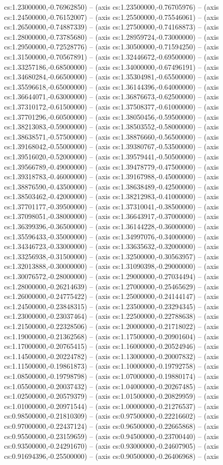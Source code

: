 cs:1.23000000,-0.76962850) -- (axis cs:1.23500000,-0.76705976) -- (axis cs:1.24500000,-0.76152007) -- (axis cs:1.25500000,-0.75546061) -- (axis cs:1.26500000,-0.74887339) -- (axis cs:1.27500000,-0.74168873) -- (axis cs:1.28000000,-0.73785680) -- (axis cs:1.28959724,-0.73000000) -- (axis cs:1.29500000,-0.72528776) -- (axis cs:1.30500000,-0.71594250) -- (axis cs:1.31500000,-0.70567891) -- (axis cs:1.32446672,-0.69500000) -- (axis cs:1.33257186,-0.68500000) -- (axis cs:1.34000000,-0.67496191) -- (axis cs:1.34680284,-0.66500000) -- (axis cs:1.35304981,-0.65500000) -- (axis cs:1.35596618,-0.65000000) -- (axis cs:1.36144396,-0.64000000) -- (axis cs:1.36644071,-0.63000000) -- (axis cs:1.36876673,-0.62500000) -- (axis cs:1.37310172,-0.61500000) -- (axis cs:1.37508377,-0.61000000) -- (axis cs:1.37701296,-0.60500000) -- (axis cs:1.38050456,-0.59500000) -- (axis cs:1.38213083,-0.59000000) -- (axis cs:1.38503552,-0.58000000) -- (axis cs:1.38638571,-0.57500000) -- (axis cs:1.38876660,-0.56500000) -- (axis cs:1.39168042,-0.55000000) -- (axis cs:1.39380767,-0.53500000) -- (axis cs:1.39516020,-0.52000000) -- (axis cs:1.39579441,-0.50500000) -- (axis cs:1.39566789,-0.49000000) -- (axis cs:1.39478779,-0.47500000) -- (axis cs:1.39318783,-0.46000000) -- (axis cs:1.39167988,-0.45000000) -- (axis cs:1.38876590,-0.43500000) -- (axis cs:1.38638489,-0.42500000) -- (axis cs:1.38503462,-0.42000000) -- (axis cs:1.38212983,-0.41000000) -- (axis cs:1.37701177,-0.39500000) -- (axis cs:1.37310041,-0.38500000) -- (axis cs:1.37098051,-0.38000000) -- (axis cs:1.36643917,-0.37000000) -- (axis cs:1.36399396,-0.36500000) -- (axis cs:1.36144228,-0.36000000) -- (axis cs:1.35596433,-0.35000000) -- (axis cs:1.34997076,-0.34000000) -- (axis cs:1.34346723,-0.33000000) -- (axis cs:1.33635632,-0.32000000) -- (axis cs:1.33256938,-0.31500000) -- (axis cs:1.32500000,-0.30563957) -- (axis cs:1.32013888,-0.30000000) -- (axis cs:1.31090398,-0.29000000) -- (axis cs:1.30076572,-0.28000000) -- (axis cs:1.29000000,-0.27034494) -- (axis cs:1.28000000,-0.26214639) -- (axis cs:1.27000000,-0.25465629) -- (axis cs:1.26000000,-0.24775422) -- (axis cs:1.25000000,-0.24144147) -- (axis cs:1.24500000,-0.23848315) -- (axis cs:1.23500000,-0.23294345) -- (axis cs:1.23000000,-0.23037464) -- (axis cs:1.22500000,-0.22788638) -- (axis cs:1.21500000,-0.22328506) -- (axis cs:1.20000000,-0.21718022) -- (axis cs:1.19000000,-0.21362568) -- (axis cs:1.17500000,-0.20901604) -- (axis cs:1.17000000,-0.20765415) -- (axis cs:1.16000000,-0.20524946) -- (axis cs:1.14500000,-0.20224782) -- (axis cs:1.13000000,-0.20007832) -- (axis cs:1.11500000,-0.19861873) -- (axis cs:1.10000000,-0.19792758) -- (axis cs:1.08500000,-0.19798798) -- (axis cs:1.07000000,-0.19880174) -- (axis cs:1.05500000,-0.20037432) -- (axis cs:1.04000000,-0.20267485) -- (axis cs:1.02500000,-0.20579379) -- (axis cs:1.01500000,-0.20829959) -- (axis cs:1.01000000,-0.20971544) -- (axis cs:1.00000000,-0.21276537) -- (axis cs:0.98500000,-0.21810309) -- (axis cs:0.97500000,-0.22216602) -- (axis cs:0.97000000,-0.22437124) -- (axis cs:0.96500000,-0.22665868) -- (axis cs:0.95500000,-0.23159659) -- (axis cs:0.94500000,-0.23700440) -- (axis cs:0.93500000,-0.24291670) -- (axis cs:0.93000000,-0.24607905) -- (axis cs:0.91694396,-0.25500000) -- (axis cs:0.90500000,-0.26406968) -- (axis 